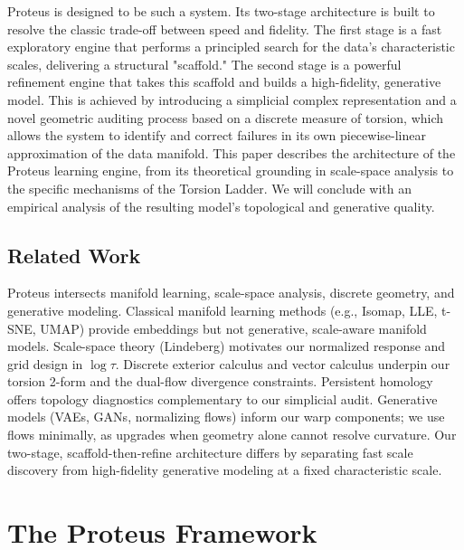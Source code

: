 \documentclass[11pt]{article}
\begin{document}
Proteus is designed to be such a system. Its two-stage architecture is built to resolve the classic trade-off between speed and fidelity. The first stage is a fast exploratory engine that performs a principled search for the data's characteristic scales, delivering a structural "scaffold." The second stage is a powerful refinement engine that takes this scaffold and builds a high-fidelity, generative model. This is achieved by introducing a simplicial complex representation and a novel geometric auditing process based on a discrete measure of torsion, which allows the system to identify and correct failures in its own piecewise-linear approximation of the data manifold. This paper describes the architecture of the Proteus learning engine, from its theoretical grounding in scale-space analysis to the specific mechanisms of the Torsion Ladder. We will conclude with an empirical analysis of the resulting model's topological and generative quality.

\subsection{Related Work}
Proteus intersects manifold learning, scale-space analysis, discrete geometry, and generative modeling. Classical manifold learning methods (e.g., Isomap, LLE, t-SNE, UMAP) provide embeddings but not generative, scale-aware manifold models. Scale-space theory (Lindeberg) motivates our normalized response and grid design in $\log\tau$. Discrete exterior calculus and vector calculus underpin our torsion 2-form and the dual-flow divergence constraints. Persistent homology offers topology diagnostics complementary to our simplicial audit. Generative models (VAEs, GANs, normalizing flows) inform our warp components; we use flows minimally, as upgrades when geometry alone cannot resolve curvature. Our two-stage, scaffold-then-refine architecture differs by separating fast scale discovery from high-fidelity generative modeling at a fixed characteristic scale.


\section{The Proteus Framework}
\end{document}
